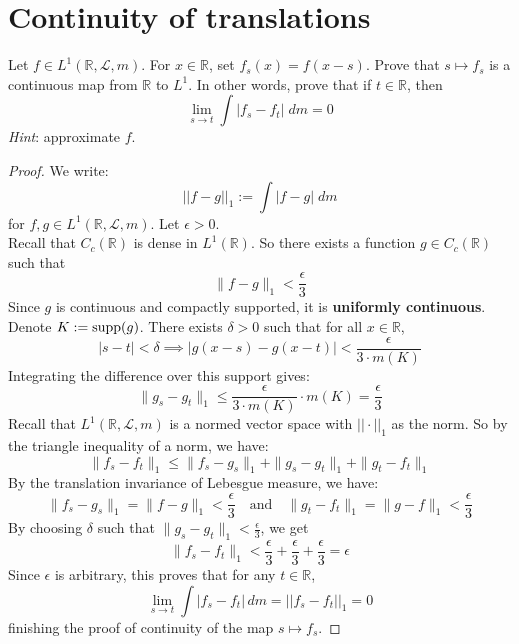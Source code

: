 \documentclass[lang=cn,11pt]{elegantbook}
\begin{document}
  \section{Continuity of translations}
  Let $f\in L^1(\mathbb{R}, \mathcal{L}, m)$. For $x\in\mathbb{R}$, set $f_s(x)= f(x-s)$. 
  Prove that $s\mapsto f_s$ is a continuous map from $\mathbb{R}$ to $L^1$. In other words, prove that if $t\in\mathbb{R}$, then 
  \[
    \lim_{s\to t} \int |f_s-f_t| \; d m =0 
  \]
  \textit{Hint}: approximate $f$. 
\begin{proof}
We write: \[
||f-g||_1 := \int |f-g| \;dm
\] for $f,g\in L^1(\mathbb{R}, \mathcal{L}, m)$.
Let $\epsilon > 0$.\\
Recall that \( C_c(\mathbb{R}) \) is dense in \( L^1(\mathbb{R}) \). So there exists a function \( g \in C_c(\mathbb{R}) \) such that
\[
\| f - g \|_1 < \frac{\epsilon}{3}
\] Since \( g \) is continuous and compactly supported, it is \textbf{uniformly continuous}. Denote $ K :=\operatorname{supp} (g) $. 
There exists \(\delta > 0\) such that for all \( x \in \mathbb{R} \),
\[
|s - t| < \delta \implies |g(x - s) - g(x - t)| < \frac{\epsilon}{3 \cdot m(K)}
\]
Integrating the difference over this support gives:
\[
\| g_s - g_t \|_1 \leq \frac{\epsilon}{3 \cdot m(K)} \cdot m(K) = \frac{\epsilon}{3}
\]
Recall that $L^1(\mathbb{R}, \mathcal{L}, m)$ is a normed vector space with $||\cdot||_1$ as the norm. So by the triangle inequality of a norm, we have:
\[
\| f_s - f_t \|_1 \leq \| f_s - g_s \|_1 + \| g_s - g_t \|_1 + \| g_t - f_t \|_1\]
By the translation invariance of Lebesgue measure, we have: 
\[
\| f_s - g_s \|_1 = \| f - g \|_1 < \frac{\epsilon}{3} \quad \text{and} \quad \| g_t - f_t \|_1 = \| g - f \|_1 < \frac{\epsilon}{3}
\]By choosing \(\delta\) such that \(\| g_s - g_t \|_1 < \frac{\epsilon}{3}\), we get
\[
\| f_s - f_t \|_1 < \frac{\epsilon}{3} + \frac{\epsilon}{3} + \frac{\epsilon}{3} = \epsilon
\]
Since $\epsilon$ is arbitrary, this proves that for any \( t \in \mathbb{R} \), \[
\lim_{s \to t} \int |f_s - f_t| \, dm =  ||f_s - f_t||_1  = 0
\]finishing the proof of continuity of the map \( s \mapsto f_s \).
\end{proof}
\end{document}
